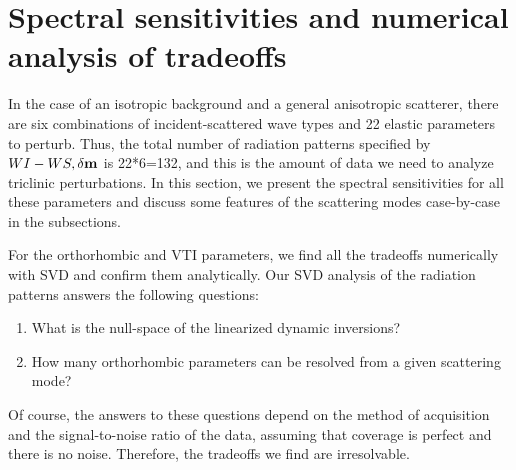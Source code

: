 \section{Spectral sensitivities and numerical analysis of tradeoffs}
In the case of an isotropic background and a general anisotropic scatterer, there are six 
combinations of incident-scattered wave types and 22 elastic 
parameters to perturb. Thus, the total number of radiation patterns specified by 
${WI-WS, \delta \mathbf{m}}$ is 22*6=132, and this is the amount of data we need to analyze triclinic perturbations. In this section, we present the spectral sensitivities for all these 
parameters and discuss some features of the scattering modes case-by-case 
in the subsections. 

For the orthorhombic and VTI parameters, 
we find all the tradeoffs numerically with SVD and confirm them 
analytically.
Our SVD analysis of the radiation patterns answers the following 
questions:
\begin{enumerate}
	\item What is the null-space of the linearized dynamic inversions?
	
	\item How many orthorhombic parameters can be resolved from a 
	given scattering mode?
\end{enumerate}
Of course, the answers to these questions depend on the method of acquisition and the signal-to-noise ratio of the data, assuming that coverage is perfect and there is no 
noise. Therefore, the tradeoffs we find are irresolvable.
